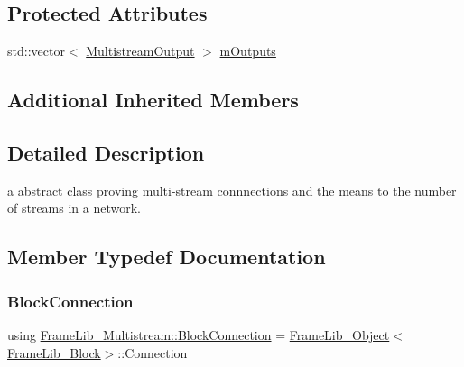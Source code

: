 \subsection*{Protected Attributes}
\begin{DoxyCompactItemize}
\item 
std\+::vector$<$ \hyperlink{class_frame_lib___multistream_a8844d112881e04687989f697a9337b11}{Multistream\+Output} $>$ \hyperlink{class_frame_lib___multistream_a996d5595c6208b3067e720dc83454706}{m\+Outputs}
\end{DoxyCompactItemize}
\subsection*{Additional Inherited Members}


\subsection{Detailed Description}
a abstract class proving multi-\/stream connnections and the means to the number of streams in a network. 

\subsection{Member Typedef Documentation}
\mbox{\label{class_frame_lib___multistream_a611f70443aaa3eb2205f578c0882c469}} 
\subsubsection{\texorpdfstring{Block\+Connection}{BlockConnection}}
{\footnotesize\ttfamily using \hyperlink{class_frame_lib___multistream_a611f70443aaa3eb2205f578c0882c469}{Frame\+Lib\+\_\+\+Multistream\+::\+Block\+Connection} =  \hyperlink{class_frame_lib___object}{Frame\+Lib\+\_\+\+Object}$<$\hyperlink{class_frame_lib___block}{Frame\+Lib\+\_\+\+Block}$>$\+::Connection\hspace{0.3cm}{\ttfamily [protected]}}

\mbox{\label{class_frame_lib___multistream_ab8c2c075b15353a370d386f546e51bb6}} 
